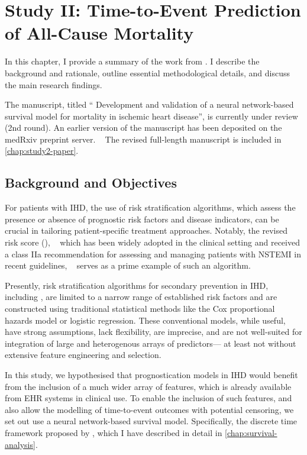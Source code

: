 \chapter{Study II: Time-to-Event Prediction of All-Cause Mortality}
\label{chap:study2-outline}

\newcommand{\graceii}{\acsfont{GRACE 2.0}}

In this chapter, I provide a summary of the work from \studyii{}.
I describe the background and rationale,
outline essential methodological details,
and discuss the main research findings.

The manuscript, titled \enquote{%
Development and validation of a neural network-based survival model 
for mortality in ischemic heart disease}, 
is currently under review (2nd round).
An earlier version of the manuscript
has been deposited on the medRxiv preprint server. 
~\autocite{holmDevelopment2023}
The revised full-length manuscript is included in 
\cref{chap:study2-paper}.

\section{Background and Objectives}

For patients with \ac{IHD}, 
the use of risk stratification algorithms, 
which assess the presence or absence of prognostic
risk factors and disease indicators, 
can be crucial in tailoring patient-specific treatment approaches. 
\autocite{knuuti20192020}
\autocite{collet20202021}
\autocite{stegESC2012}
Notably, the revised  risk score (),
~\autocite{foxShould2014}
which has been widely adopted in the clinical setting and 
received a class IIa recommendation for assessing and managing patients
with \ac{NSTEMI} in recent  guidelines,
~\autocite{collet20202021}
serves as a prime example of such an algorithm.

Presently,
risk stratification algorithms for secondary prevention in \ac{IHD},
including , 
are limited to a narrow range of established risk factors and are constructed
using traditional statistical methods like the Cox proportional hazards model
or logistic regression. 
These conventional models, while useful, 
have strong assumptions, lack flexibility, are imprecise, and are not well-suited
for integration of large and heterogenous arrays of predictors---%
at least not without extensive feature engineering and selection.

In this study, we hypothesised that prognostication models in \ac{IHD}
would benefit from the inclusion of a much wider array of features,
which is already available from \ac{EHR} systems in clinical use.
To enable the inclusion of such features, and also allow the modelling
of time-to-event outcomes with potential censoring, we set out 
use a neural network-based survival model. Specifically, the 
discrete time framework proposed by \textcite{gensheimerScalable2019}, 
which I have described in detail in \cref{chap:survival-analysis}.

